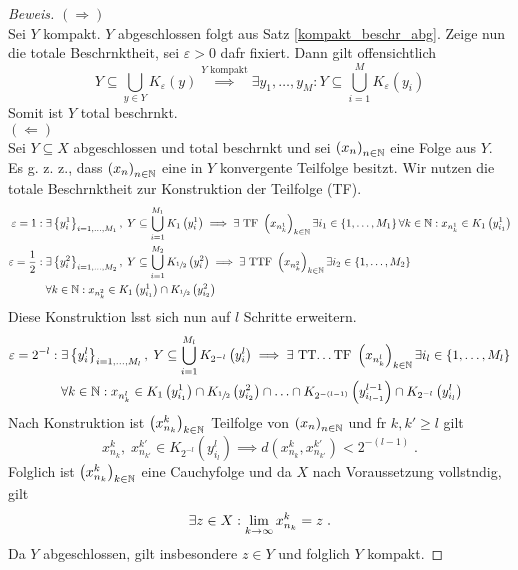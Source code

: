 \begin{proof}[Beweis]
	 \((\Longrightarrow)\)\\
	 Sei $Y$ kompakt. $Y$ abgeschlossen folgt aus Satz  \ref{kompakt_beschr_abg}. Zeige nun die totale Beschr\as nktheit, sei $\varepsilon>0$ daf\us r fixiert. Dann gilt offensichtlich
	 \[Y \subseteq \bigcup_{y\in Y} K_\varepsilon(y) \overset{\text{$Y$ kompakt}}{\implies}\exists y_1,\ldots,y_M: Y \subseteq \bigcup_{i=1}^M K_\varepsilon(y_i)\]
	 Somit ist $Y$ total beschr\as nkt. \\
	 \((\Longleftarrow)\)\\
	 Sei $Y\subseteq X$ abgeschlossen und total beschr\as nkt und sei \(\left (x_n\right )_{n\in \mathbb{N}}\) eine Folge aus $Y$. Es g. z. z., dass \(\left (x_n\right )_{n\in \mathbb{N}}\) eine in $Y$ konvergente Teilfolge besitzt. 
	 Wir nutzen die totale Beschr\as nktheit zur Konstruktion der Teilfolge (TF).
	 \begin{align*}
	  \varepsilon = 1: \; &\exists \left\{y^1_i\right\}_{i = 1,\ldots, M_1}, \; Y \subseteq \bigcup_{i=1}^{M_1} K_1\left(y^1_i\right) \implies \exists \text{ TF } \left (x_{n^1_k}\right )_{k\in \mathbb{N}} \exists i_1 \in \left\{1,\ldots,M_1\right\} \forall k \in \mathbb{N}: x_{n^1_k} \in K_1\left(y_{i_1}^1\right) \\
	 	 \varepsilon = \frac{1}{2}: \; &\exists \left\{y^2_i\right\}_{i = 1,\ldots, M_2}, \; Y \subseteq \bigcup_{i=1}^{M_2} K_{\sfrac12}\left(y^2_i\right) \implies \exists \text{ TTF } \left (x_{n^2_k}\right )_{k\in \mathbb{N}} \exists i_2 \in \left\{1,\ldots,M_2\right\}\\
	 	 & \forall k \in \mathbb{N}: x_{n^2_k} \in K_1\left(y_{i_1}^1\right) \cap K_{\sfrac12}\left(y_{i_2}^2\right)
	 \end{align*}
	 Diese Konstruktion l\as sst sich nun auf $l$ Schritte erweitern.
	 \begin{align*}
	 	 \varepsilon = 2^{-l}: \; &\exists \left\{y^l_i\right\}_{i = 1,\ldots, M_l}, \; Y \subseteq \bigcup_{i=1}^{M_l} K_{2^{-l}}\left(y^l_i\right) \implies \exists \text{ TT\ldots TF } \left (x_{n^l_k}\right )_{k\in \mathbb{N}} \exists i_l \in \left\{1,\ldots,M_l\right\}\\
	 	& \forall k \in \mathbb{N}: x_{n^l_k} \in K_1\left(y_{i_1}^1\right) \cap K_{\sfrac12}\left(y_{i_2}^2\right) \cap \ldots \cap K_{2^{-(l-1)}}\left(y_{i_{l-1}}^{l-1}\right) \cap K_{2^{-l}}\left(y_{i_{l}}^l\right)
	 	\end{align*}
	 Nach Konstruktion ist \(\left (x_{n_k}^k\right )_{k\in \mathbb{N}}\) Teilfolge von \(\left (x_n\right )_{n\in \mathbb{N}}\) und f\us r \(k, k'\geq l\) gilt
	 \[x_{n_k}^k,\; x_{n_{k'}}^{k'} \in K_{2^{-l}}\left(y_{i_{l}}^l\right) \implies d\left(x_{n_k}^k, x_{n_{k'}}^{k'}\right) < 2^{-(l-1)}\;.\]
	 Folglich ist \(\left (x_{n_k}^k\right )_{k\in \mathbb{N}}\) eine Cauchyfolge und da $X$ nach Voraussetzung vollst\as ndig, gilt 
	 \[\exists z\in X: \lim_{k \to\infty} x_{n_k}^k = z \;.\]
	 Da $Y$ abgeschlossen, gilt insbesondere \(z\in Y\) und folglich $Y$ kompakt.
	\end{proof}

